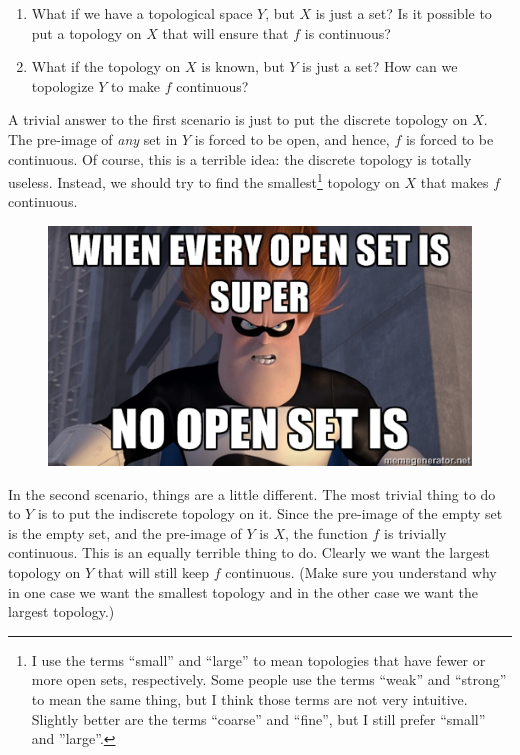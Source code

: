\documentclass[12pt]{article}
\begin{document}
\begin{enumerate}
\item
What if we have a topological space $Y$, but $X$ is just a set? Is it possible to put a topology on $X$ that will ensure that $f$ is continuous?
\item
What if the topology on $X$ is known, but $Y$ is just a set? How can we topologize $Y$ to make $f$ continuous?
\end{enumerate}

A trivial answer to the first scenario is just to put the discrete topology on $X$. The pre-image of \emph{any} set in $Y$ is forced to be open, and hence, $f$ is forced to be continuous. Of course, this is a terrible idea: the discrete topology is totally useless. Instead, we should try to find the smallest\footnote{I use the terms ``small'' and ``large'' to mean topologies that have fewer or more open sets, respectively. Some people use the terms ``weak'' and ``strong'' to mean the same thing, but I think those terms are not very intuitive. Slightly better are the terms ``coarse'' and ``fine'', but I still prefer ``small'' and ''large''.} topology on $X$ that makes $f$ continuous.

\begin{figure}[H]
\centering
\includegraphics{open_set_super.jpg}
\end{figure}

In the second scenario, things are a little different. The most trivial thing to do to $Y$ is to put the indiscrete topology on it. Since the pre-image of the empty set is the empty set, and the pre-image of $Y$ is $X$, the function $f$ is trivially continuous. This is an equally terrible thing to do. Clearly we want the largest topology on $Y$ that will still keep $f$ continuous. (Make sure you understand why in one case we want the smallest topology and in the other case we want the largest topology.)
\end{document}
